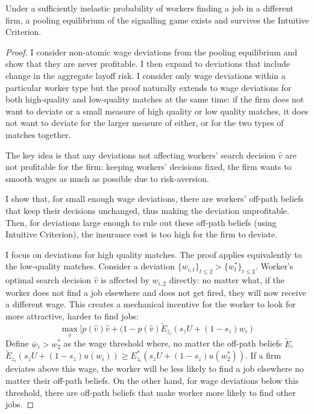 \begin{proposition}
    Under a sufficiently inelastic probability of workers finding a job in a different firm, a pooling equilibrium of the signalling game exists and survives the Intuitive Criterion. 
\end{proposition}
\begin{proof}
    I consider non-atomic wage deviations from the pooling equilibrium and show that they are never profitable. I then expand to deviations that include change in the aggregate layoff risk. I consider only wage deviations within a particular worker type but the proof naturally extends to wage deviations for both high-quality and low-quality matches at the same time: if the firm does not want to deviate or a small measure of high quality or low quality matches, it does not want to deviate for the larger measure of either, or for the two types of matches together.

    The key idea is that any deviations not affecting workers' search decision $\hat{v}$ are not profitable for the firm: keeping workers' decisions fixed, the firm wants to smooth wages as much as possible due to risk-aversion.

    I show that, for small enough wage deviations, there are workers' off-path beliefs that keep their decisions unchanged, thus making the deviation unprofitable. Then, for deviations large enough to rule out these off-path beliefs (using Intuitive Criterion), the insurance cost is too high for the firm to deviate.

    I focus on deviations for high quality matches. The proof applies equivalently to the low-quality matches. Consider a deviation $\{w_{i,t}\}_{t\leq 2} > \{w^*_t\}_{t\leq 2}$. Worker's optimal search decision $\hat{v}$ is affected by $w_{i,2}$ directly: no matter what, if the worker does not find a job elsewhere and does not get fired, they will now receive a different wage. This creates a mechanical incentive for the worker to look for more attractive, harder to find jobs:
    \[ \max_{\hat{v}} [ p(\hat{v})\hat{v}+(1-p(\hat{v})\tilde{E}_{z_i}(s_z U + (1-s_z) w_i)\]
    Define $\bar{w}_i>w^*_2$ as the wage threshold where, no matter the off-path beliefs $\tilde{E}$, $\tilde{E}_{z_i}(s_z U + (1-s_z) u(w_i)) \geq E^*_{z_i}(s_z U + (1-s_z)u(w^*_2))$. If a firm deviates above this wage, the worker will be less likely to find a job elsewhere no matter their off-path beliefs. On the other hand, for wage deviations below this threshold, there are off-path beliefs that make worker more likely to find other jobs.


\end{proof}
